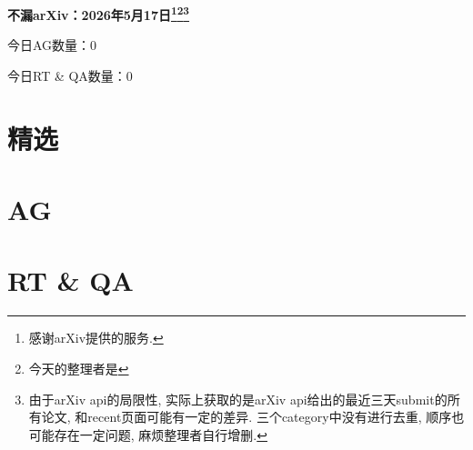 \documentclass[9pt, a4paper]{article}
\theoremstyle{plain}
\theoremstyle{definition}
\theoremstyle{remark}
\newcommand{\AGnumber}{0}
\newcommand{\RTQAnumber}{0}
\newcommand{\NewestDate}{2026年5月17日}
\newcommand{\todayarXiver}{} %
\begin{document}
\begin{center}
    \Huge\textbf{不漏arXiv：\NewestDate\footnote{感谢arXiv提供的服务.}\footnote{今天的整理者是\todayarXiver}\footnote{由于arXiv api的局限性, 实际上获取的是arXiv api给出的最近三天submit的所有论文, 和recent页面可能有一定的差异. 三个category中没有进行去重, 顺序也可能存在一定问题, 麻烦整理者自行增删.}} \\
\end{center}

\setcounter{section}{-1}

\begin{center}
    今日AG数量：\AGnumber
    
    今日RT \& QA数量：\RTQAnumber
    
\end{center}


\section{精选}


\section{AG}

\section{RT \& QA}
\end{document}
